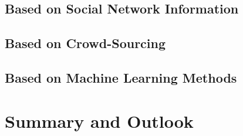 \subsection{Based on Social Network Information}


\subsection{Based on Crowd-Sourcing}


\subsection{Based on Machine Learning Methods}


\section{Summary and Outlook}


























\newpage